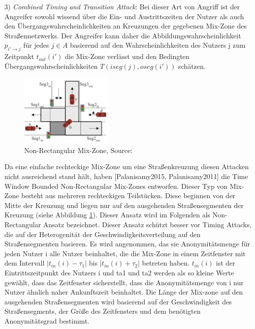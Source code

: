  3)	\textit{Combined  Timing and Transition Attack}: Bei dieser Art von Angriff ist der Angreifer sowohl wissend über die Ein- und Austrittszeiten der Nutzer als auch den Übergangswahrscheinlichkeiten an Kreuzungen der gegebenen Mix-Zone des Straßennetzwerks. Der Angreifer kann  daher die Abbildungswahrscheinlichkeit $p_{i'\rightarrow j}$ für jedes $j \in A$ basierend auf den Wahrscheinlichkeiten des Nutzers j zum Zeitpunkt $t_{out}(i')$ die Mix-Zone verlässt und den Bedingten Übergangswahrscheinlichkeiten $T(iseg(j), oseg(i'))$ schätzen. 
 
 \begin{figure}[!h]
 	\centering
 	\includegraphics[width=0.4\textwidth]{Bilder/nonrectangularMix.PNG}
 	\caption{Non-Rectangular Mix-Zone, Source: \protect\cite{Chow2011}}
 	\label{fig_MixSrasseNon}
 \end{figure}
 
 Da eine einfache rechteckige Mix-Zone um eine Straßenkreuzung diesen Attacken nicht ausreichend stand hält, haben [Palanisamy2015, Palanisamy2011] die Time Window Bounded Non-Rectangular Mix-Zones entworfen. Dieser Typ von Mix-Zone besteht aus mehreren rechteckigen Teilstücken.  Diese beginnen von der Mitte der Kreuzung und liegen nur auf den ausgehenden Straßensegmenten der Kreuzung  (siehe Abbildung \ref{fig_MixSrasseNon}). Dieser Ansatz wird im Folgenden als Non-Rectangular Ansatz bezeichnet. Dieser Ansatz schützt besser vor Timing Attacks, die auf der Heterogenität der  Geschwindigkeitsverteilung auf den Straßensegmenten basieren. Es wird angenommen, das sie Anonymitätsmenge für jeden Nutzer i alle Nutzer beinhaltet, die die Mix-Zone in einem Zeitfenster mit dem Intervall $| t_{in}(i)-\tau_{1}|$ bis $|t_{in}(i)+\tau_{2}|$ betreten haben. $t_{in}(i)$ ist der Eintrittszeitpunkt des Nutzers i und ta1 und ta2 werden als so kleine Werte gewählt, dass das Zeitfenster sicherstellt, dass die Anonymitätsmenge von i nur Nutzer ähnlich naher Ankunftszeit beinhaltet. Die Länge der Mix-zone auf den ausgehenden Straßensegmenten  wird basierend auf der Geschwindigkeit des Straßensegments, der Größe des Zeitfensters und dem benötigten Anonymitätsgrad bestimmt.     